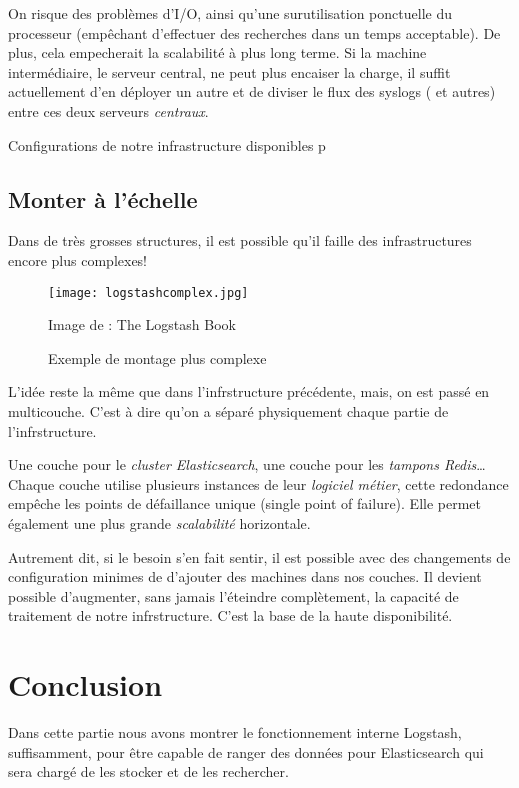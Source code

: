 On risque des problèmes d'I/O, ainsi qu'une surutilisation ponctuelle du processeur
(empêchant d'effectuer des recherches dans un temps acceptable).
De plus, cela empecherait la scalabilité à plus long terme. 
Si la machine intermédiaire, le serveur central, ne peut plus encaiser la charge, 
il suffit actuellement d'en déployer un autre et de diviser le flux des syslogs (
et autres) entre ces deux serveurs \textit{centraux}.

Configurations de notre infrastructure disponibles p\pageref{sec:codeprod}


\subsection{Monter à l'échelle}
Dans de très grosses structures, il est possible qu'il faille des infrastructures
encore plus complexes!

\begin{figure}[H]
\center
\texttt{[image: logstashcomplex.jpg]}
\label{fig:logstashcomplex}
\caption{Exemple de montage plus complexe}
{\footnotesize Image de : The Logstash Book}
\end{figure}

L'idée reste la même que dans l'infrstructure précédente, mais, on est passé en multicouche.
C'est à dire qu'on a séparé physiquement chaque partie de l'infrstructure. 

Une couche pour le \textit{cluster Elasticsearch}, une couche pour les \textit{tampons Redis}\ldots
Chaque couche utilise plusieurs instances de leur \textit{logiciel métier}, cette redondance empêche les
points de défaillance unique (single point of failure). Elle permet également une
plus grande \textit{scalabilité} horizontale. 

Autrement dit, si le besoin s'en fait
sentir, il est possible avec des changements de configuration minimes de d'ajouter
des machines dans nos couches. Il devient possible d'augmenter, sans jamais l'éteindre
complètement, la capacité de traitement de notre infrstructure. C'est la base de la
haute disponibilité.


\section{Conclusion}
Dans cette partie nous avons montrer le fonctionnement interne Logstash, suffisamment, 
pour être capable de ranger des données pour Elasticsearch qui sera chargé de les stocker
et de les rechercher.


